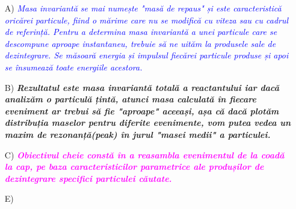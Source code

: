 \documentclass{beamer}
\begin{document}
\begin{frame}{\textbf{}}

\vspace{0cm}
\begin{enumerate}
  \small
  \item[A)] \makebox[0.5cm ]{} \textit{ \textcolor{blue}{Masa invariantă se mai numește "masă de repaus" și este caracteristică oricărei particule, fiind o mărime care nu se modifică cu viteza sau cu cadrul de referință. 
 Pentru a determina masa invariantă a unei particule care se descompune aproape instantaneu, trebuie să ne uităm la produsele sale de dezintegrare. Se măsoară energia și impulsul fiecărei particule produse și apoi se însumează toate energiile acestora.}}\\
 
  \item[B)] \makebox[0.5cm]{} \textit{\textbf{Rezultatul este masa invariantă totală a reactantului iar dacă analizăm o particulă țintă, atunci masa calculată în fiecare eveniment ar trebui să fie "aproape" aceeași, așa că dacă plotăm distribuția maselor pentru diferite evenimente, vom putea vedea un maxim de rezonanță(peak) în jurul "masei medii" a particulei.}}\\

   \item[C)] \makebox[0.5cm]{} \textit{\textbf{\textcolor{magenta}{Obiectivul cheie constă în a reasambla evenimentul de la coadă la cap, pe baza caracteristicilor parametrice ale produșilor de dezintegrare specifici particulei căutate.}}}

    \item[E)] \makebox[0.5cm]{} \textit{\textbf{}}
   
\end{enumerate}

\end{frame}
\end{document}
